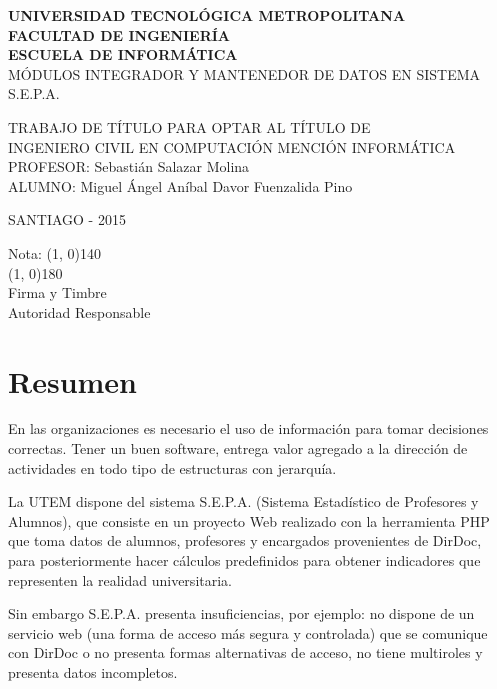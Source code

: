 \documentclass[a4paper,12pt,openany,oneside]{book}
\begin{document}

\begin{center}
\textbf{UNIVERSIDAD TECNOLÓGICA METROPOLITANA\\
FACULTAD DE INGENIERÍA\\
ESCUELA DE INFORMÁTICA}\\
\vspace{3cm}
MÓDULOS INTEGRADOR Y MANTENEDOR DE DATOS EN SISTEMA S.E.P.A.
\end{center}
\begin{flushright}
TRABAJO DE TÍTULO PARA OPTAR AL TÍTULO DE\\
INGENIERO CIVIL EN COMPUTACIÓN MENCIÓN INFORMÁTICA\\
\vspace{3cm}
PROFESOR: Sebastián Salazar Molina\\
\vspace{1.5cm}
ALUMNO: Miguel Ángel Aníbal Davor Fuenzalida Pino
\end{flushright}
\vspace{4cm}
\begin{center}
SANTIAGO - 2015
\end{center}
\newpage
\thispagestyle{empty}
\begin{flushright}
\vspace{20mm}
Nota: \line(1, 0){140} \\
\vspace{30 mm}
\line(1, 0){180}\\	
Firma y Timbre\\
Autoridad Responsable
\end{flushright}
\chapter*{Resumen}
\thispagestyle{empty}
En las organizaciones es necesario el uso de información para tomar decisiones correctas. Tener un buen software, entrega valor agregado a la dirección de actividades en todo tipo de estructuras con jerarquía.

La UTEM dispone del sistema S.E.P.A. (Sistema Estadístico de Profesores y Alumnos), que consiste en un proyecto Web realizado con la herramienta PHP que toma datos de alumnos, profesores y encargados provenientes de DirDoc, para posteriormente hacer cálculos predefinidos para obtener indicadores que representen la realidad universitaria.

Sin embargo S.E.P.A. presenta insuficiencias, por ejemplo: no dispone de un servicio web (una forma de acceso más segura y controlada) que se comunique con DirDoc o no presenta formas alternativas de acceso, no tiene multiroles y presenta datos incompletos.
\end{document}
